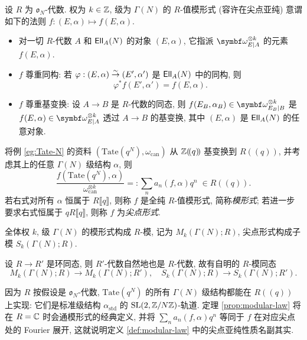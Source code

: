 \begin{definition}\label{def:modular-law} 
	设 $R$ 为 $\mathfrak{o}_N$-代数. 权为 $k \in \mathbb{Z}$, 级为 $\Gamma(N)$ 的 $R$-值模形式 (容许在尖点亚纯) 意谓如下的法则 $f: (E, \alpha) \mapsto f(E, \alpha)$.
	\begin{itemize}
		\item 对一切 $R$-代数 $A$ 和 $\mathsf{Ell}_A(N)$ 的对象 $(E, \alpha)$, 它指派 $\bomega_{E|A}^{\otimes k}$ 的元素 $f(E, \alpha)$.
		\item $f$ 尊重同构: 若 $\varphi: (E, \alpha) \stackrel{\sim}{\rightarrow} (E', \alpha')$ 是 $\mathsf{Ell}_A(N)$ 中的同构, 则
		\[ \varphi^* f(E', \alpha') = f(E, \alpha). \]
		\item $f$ 尊重基变换: 设 $A \to B$ 是 $R$-代数的同态, 则 $f(E_B, \alpha_B) \in \bomega_{E_B|B}^{\otimes k}$ 是 $f(E, \alpha) \in \bomega_{E|A}^{\otimes k}$ 透过 $A \to B$ 的基变换, 其中 $(E, \alpha)$ 是 $\mathsf{Ell}_A(N)$ 的任意对象.
	\end{itemize}

	将例 \ref{eg:Tate-N} 的资料 $\left( \mathrm{Tate}\left(q^N \right), \omega_{\mathrm{can}}\right)$ 从 $\mathbb{Z}(\!(q)\!)$ 基变换到 $R(\!(q)\!)$, 并考虑其上的任意 $\Gamma(N)$ 级结构 $\alpha$, 则
	\[ \dfrac{f\left( \mathrm{Tate}\left(q^N\right), \alpha \right)}{\omega_{\mathrm{can}}^{\otimes k}} =: \sum_n a_n(f, \alpha) q^n \; \in R(\!(q)\!). \]
	若右式对所有 $\alpha$ 恒属于 $R\llbracket q \rrbracket$, 则称 $f$ 是全纯 $R$-值模形式, 简称\emph{模形式}; 若进一步要求右式恒属于 $q R\llbracket q\rrbracket$, 则称 $f$ 为\emph{尖点形式}.
\end{definition}

\begin{convention}
	全体权 $k$, 级 $\Gamma(N)$ 的模形式构成 $R$-模, 记为 $M_k(\Gamma(N); R)$, 尖点形式构成子模 $S_k(\Gamma(N); R)$.
\end{convention}

设 $R \to R'$ 是环同态, 则 $R'$-代数自然地也是 $R$-代数, 故有自明的 $R$-模同态
\begin{equation}\label{eqn:M-S-basechange}
	M_k(\Gamma(N); R) \to M_k(\Gamma(N); R'), \quad S_k(\Gamma(N); R) \to S_k(\Gamma(N); R').
\end{equation}

因为 $R$ 按假设是 $\mathfrak{o}_N$-代数, $\mathrm{Tate}\left(q^N\right)$ 的所有 $\Gamma(N)$ 级结构都能在 $R(\!(q)\!)$ 上实现: 它们是标准级结构 $\alpha_{\mathrm{std}}$ 的 $\operatorname{SL}(2, \mathbb{Z}/N\mathbb{Z})$-轨道. 定理 \ref{prop:modular-law} 将在 $R = \mathbb{C}$ 时会通模形式的经典定义, 并将 $\sum_n a_n(f, \alpha) q^n$ 等同于 $f$ 在对应尖点处的 Fourier 展开, 这就说明定义 \ref{def:modular-law} 中的尖点亚纯性质名副其实.

